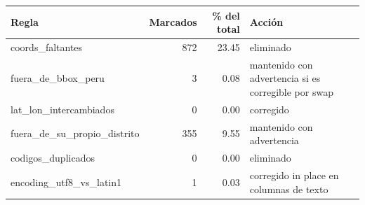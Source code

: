 \begin{tabular}{lrrp{5.4cm}}
\toprule
Regla & Marcados & \% del total & Acción \\
\midrule
coords\_faltantes & 872 & 23.45 & eliminado \\
fuera\_de\_bbox\_peru & 3 & 0.08 & mantenido con advertencia si es corregible por swap \\
lat\_lon\_intercambiados & 0 & 0.00 & corregido \\
fuera\_de\_su\_propio\_distrito & 355 & 9.55 & mantenido con advertencia \\
codigos\_duplicados & 0 & 0.00 & eliminado \\
encoding\_utf8\_vs\_latin1 & 1 & 0.03 & corregido in place en columnas de texto \\
\bottomrule
\end{tabular}
